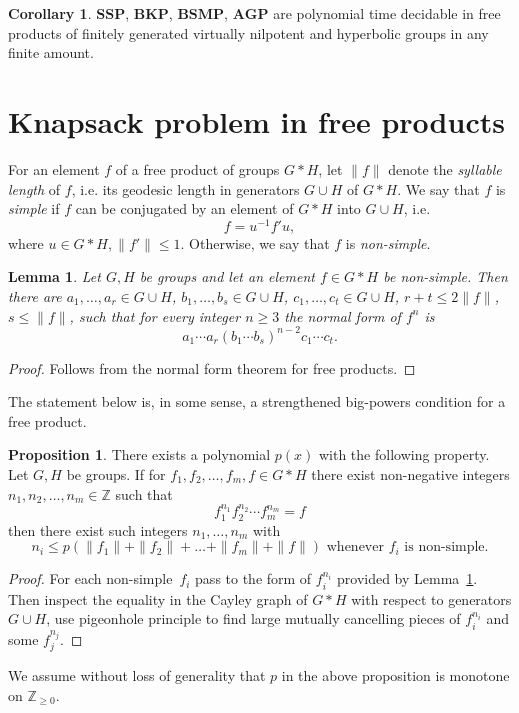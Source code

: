 \documentclass[10pt]{amsart}
\newtheorem{lemma}[theorem]{Lemma}
\theoremstyle{definition}
\newtheorem{proposition}[theorem]{Proposition}
\newtheorem{corollary}[theorem]{Corollary}
\def\SSP{{\mathbf{SSP}}}
\def\BSMP{{\mathbf{BSMP}}}
\def\BKP{{\mathbf{BKP}}}
\def\AGP{{\mathbf{AGP}}}
\def\dumb{simple} %
\def\nondumb{non-simple} %
\begin{document}
\begin{corollary}
$\SSP$, $\BKP$, $\BSMP$, $\AGP$ are polynomial time decidable in free products of finitely generated virtually nilpotent and hyperbolic groups in any finite amount.
\end{corollary}

\section{Knapsack problem in free products}\label{sec:knapsack}
For an element $f$ of a free product of groups $G*H$, let $\|f\|$ denote the {\em syllable length} of $f$, i.e. its geodesic length in generators $G\cup H$ of $G*H$. We say that $f$ is {\em \dumb} if $f$ can be conjugated by an element of $G*H$ into $G\cup H$, i.e.
\begin{equation}\label{eq:simple}
f=u^{-1}f'u,
\end{equation}
where $u\in G*H, \|f'\|\le 1$. Otherwise, we say that $f$ is {\em \nondumb}.

\begin{lemma}\label{le:power}
Let $G,H$ be groups and let an element $f\in G\ast H$ be \nondumb.
Then there are $a_1,\ldots,a_r\in G\cup H$, $b_1,\ldots,b_s\in G\cup H$, $c_1,\ldots,c_t\in G\cup H$, $r+t\le 2\|f\|$, $s\le \|f\|$, such that for every integer $n\ge 3$ the normal form of $f^n$ is
$$
a_1\cdots a_r(b_1\cdots b_s)^{n-2}c_1\cdots c_t.
$$
\end{lemma}
\begin{proof} Follows from the normal form theorem for free products.
\end{proof}

The statement below is, in some sense, a strengthened big-powers condition for a free product.
\begin{proposition}\label{pr:big_power}
There exists a polynomial $p(x)$ with the following property. Let $G,H$ be groups. If for $f_1,f_2,\ldots, f_m, f\in G*H$ there exist non-negative integers $n_1,n_2,\ldots,n_m\in\mathbb Z$ such that
$$
f_1^{n_1}f_2^{n_2}\cdots f_m^{n_m}=f
$$
then there exist such integers $n_1,\ldots,n_m$ with
$$n_i\le p(\|f_1\|+\|f_2\|+\ldots+\|f_m\|+\|f\|)\mbox{ whenever } f_i\mbox{ is \nondumb}.
$$
\end{proposition}
\begin{proof}
For each \nondumb\ $f_i$ pass to the form of $f_i^{n_i}$ provided by Lemma~\ref{le:power}. Then inspect the equality in the Cayley graph of $G*H$ with respect to generators $G\cup H$, use pigeonhole principle to find large mutually cancelling pieces of $f_i^{n_i}$ and some $f_j^{n_j}$.
\end{proof}
We assume without loss of generality that $p$ in the above proposition is monotone on $\mathbb{Z}_{\ge 0}$.
\end{document}
